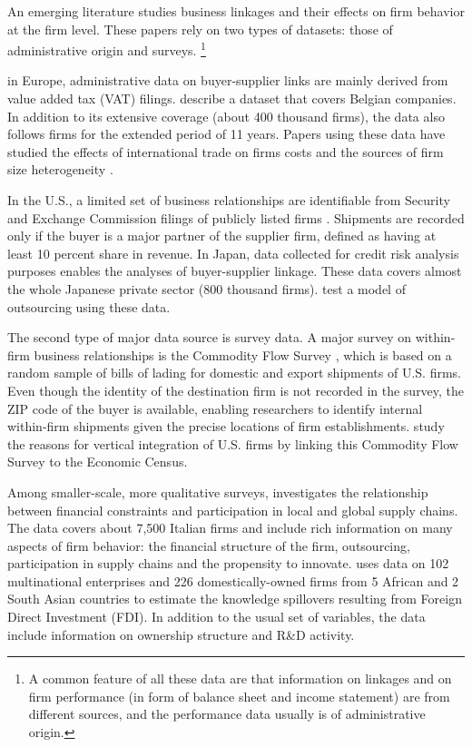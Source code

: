 \documentclass[final, dvipsnames, authoryear,12pt]{elsarticle}
\begin{document}
An emerging literature studies business linkages and their effects on firm behavior at the firm level. These papers rely on two types of datasets: those of administrative origin and surveys. \footnote{A common feature of all these data are that information on linkages and on firm performance (in form of balance sheet and income statement) are from different sources, and the performance data usually is of administrative origin.} 

in Europe, administrative data on buyer-supplier links are mainly derived from value added tax (VAT) filings. \cite{dhyne2015belgian} describe a dataset that covers Belgian companies. In addition to its extensive coverage (about 400 thousand firms), the data also follows firms for the extended period of 11 years. Papers using these data have studied the effects of international trade on firms costs \citep{tintelnot2018trade} and the sources of firm size heterogeneity \citep{bernard2019production}. 

In the U.S., a limited set of business relationships are identifiable from Security and Exchange Commission filings of publicly listed firms \citep{Barrot2016-wc}. Shipments are recorded only if the buyer is a major partner of the supplier firm, defined as having at least 10 percent share in revenue. In Japan, data collected for credit risk analysis purposes enables the analyses of buyer-supplier linkage. These data covers almost the whole Japanese private sector (800 thousand firms). \cite{bernard2019production} test a model of outsourcing using these data. 



The second type of major data source is survey data. A major survey on within-firm business relationships is the Commodity Flow Survey \cite{CFS}, which is based on a random sample of bills of lading for domestic and export shipments of U.S. firms. Even though the identity of the destination firm is not recorded in the survey, the ZIP code of the buyer is available, enabling researchers to identify internal within-firm shipments given the precise locations of firm establishments. \cite{atalay2014vertical} study the reasons for vertical integration of U.S. firms by linking this Commodity Flow Survey to the Economic Census.  


Among smaller-scale, more qualitative surveys, \cite{minetti2018financial} investigates the relationship between financial constraints and participation in local and global supply chains. The data covers about 7,500 Italian firms and include rich information on many aspects of firm behavior: the financial structure of the firm, outsourcing, participation in supply chains and the propensity to innovate. \cite{newman2018linked}  uses data on 102 multinational enterprises and 226 domestically-owned firms from 5 African and 2 South Asian countries to estimate the knowledge spillovers resulting from Foreign Direct Investment (FDI). In addition to the usual set of variables, the data include information on ownership structure and R\&D activity.
\end{document}
